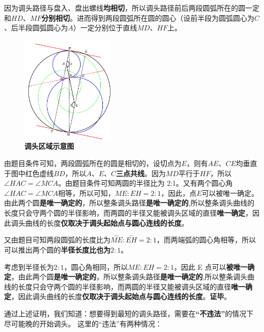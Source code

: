 \documentclass[zihao=-4, UTF8]{article}		%
\theoremstyle{MyLineTheoremStyle} %
\theoremstyle{MyBlockTheoremStyle} %
\theoremstyle{MySubsubsectionStyle} %
\begin{document}
因为调头路径与盘入、盘出螺线\textbf{均相切}，所以调头路径前后两段圆弧所在的圆一定和$HD$、$MF$\textbf{分别相切}。进而得到两段圆弧所在圆的圆心（设前半段为圆弧圆心为$C$、后半段圆弧圆心为$A$）一定分别位于直线$MD$、$HF$上。

\begin{figure}[H]
    \centering
    \includegraphics[width=0.4\textwidth]{assets/t4circle.pdf}
    \caption{\textbf{调头区域示意图}}
    \label{调头区域示意图}
\end{figure}

由题目条件可知，两段圆弧所在的圆是相切的，设切点为$E$，则有$AE$、$CE$均垂直于图中红色虚线$BD$，所以$A$、$E$、$C$\textbf{三点共线}。因为$MD$平行于$HF$，所以$\angle{HAC}=\angle{MCA}$。由题目条件可知两圆的半径比为 2:1。又有两个圆心角$\angle{HAC}=\angle{MCA}$相等，所以可知，$ME:EH=2:1$，因此，点$E$可以被唯一确定。由此两个圆\textbf{是唯一确定的}，所以整条调头路径\textbf{是唯一确定的},所以整条调头曲线的长度只会守两个圆的半径影响，而两圆的半径又能被调头区域的直径\textbf{唯一确定}，因此调头曲线的长度\textbf{仅取决于调头起始点与圆心连线的长度}。

又由题目可知两段圆弧的长度比为$\overset{\frown}{ME}:\overset{\frown}{EH}=2:1$，而两端弧的圆心角相等，所以可以推出两个圆的\textbf{半径长度比也为$2:1$}。

考虑到半径长为$2:1$，圆心角相同，所以$ME:EH=2:1$，因此 E 点可以\textbf{被唯一确定}，由此两个圆\textbf{是唯一确定的}，所以整条调头路径\textbf{是唯一确定的},所以整条调头曲线的长度只会守两个圆的半径影响，而两圆的半径又能被调头区域的直径\textbf{唯一确定}，因此调头曲线的长度\textbf{仅取决于调头起始点与圆心连线的长度}。\textbf{证毕}。






\vspace{4mm}

通过上述证明，我们知道：想要得到最短的调头路径，需要在\textbf{“不违法”}的情况下尽可能晚的开始调头。
这里的“违法”有两种情况：
\end{document}

